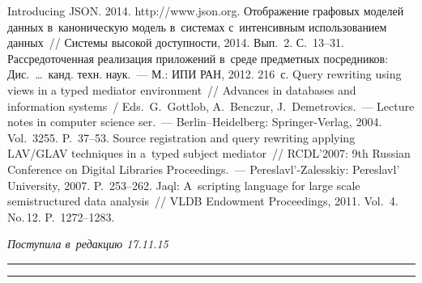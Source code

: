 \begin{multicols}{2}
{{\begin{thebibliography}{99}
Introducing JSON. 2014. {\sf http://www.json.org}.
 Отображение графовых моделей данных в~каноническую модель 
в~системах с~интенсивным использованием данных~// Системы высокой доступности, 
2014. Вып.~2. С.~13--31.
 Рассредоточенная реализация приложений в~среде предметных 
посредников: Дис.\ \ldots\ канд. техн. наук.~--- М.: ИПИ РАН, 2012. 216~с.
 Query rewriting using views in a 
typed mediator environment~// Advances in databases and information systems~/
Eds.\ G.~Gottlob, A.~Benczur, J.~Demetrovics.~---
 Lecture notes in computer science ser.~---  
Berlin--Heidelberg: Springer-Verlag, 2004. Vol.~3255.  P.~37--53.
 Source registration and query 
rewriting applying LAV/GLAV techniques in a~typed subject mediator~// RCDL'2007:  9th 
Russian Conference on Digital Libraries Proceedings.~--- Pereslavl'-Zalesskiy: Pereslavl' 
University, 2007. P.~253--262.
 Jaql: A~scripting language for large scale semistructured data analysis~//  VLDB 
Endowment Proceedings, 2011. Vol.~4. No.\,12. P.~1272--1283.
\end{thebibliography}

 }
 }

\end{multicols}

\vspace*{-12pt}

\hfill{\small\textit{Поступила в~редакцию 17.11.15}}

\vspace*{4pt}



\hrule

\vspace*{2pt}

\hrule

\vspace*{-4pt}



\def\tit{CO-LENDING SYSTEMIC RISK ANALYSIS OVER~HETEROGENEOUS DATA COLLECTIONS}

\def\titkol{Co-lending systemic risk analysis over heterogeneous data collections}

